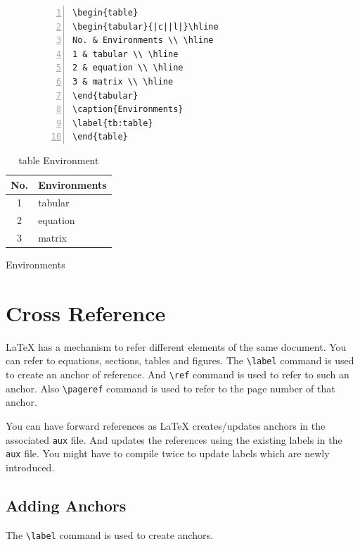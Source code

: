 \documentclass{article}
\theoremstyle{definition}
\theoremstyle{remark}
\begin{document}
\begin{table}[h]
\centering
\begin{subfigure}{0.45\textwidth}
\begin{Verbatim}[numbers = left]
\begin{table}
\begin{tabular}{|c||l|}\hline
No. & Environments \\ \hline
1 & tabular \\ \hline
2 & equation \\ \hline
3 & matrix \\ \hline
\end{tabular}
\caption{Environments}
\label{tb:table}
\end{table}
\end{Verbatim}
\end{subfigure}
\begin{minipage}{0.45\textwidth} 
\centering
\begin{tabular}{|c||l|} \hline
 No. & Environments \\ \hline
1 & tabular \\ \hline
2 & equation \\ \hline
3 & matrix \\ \hline
\end{tabular}
\caption{Environments}
\label{tb:table}
\end{minipage}
\caption{table Environment}
\label{tb:tableEnvironment}
\end{table}

\section{Cross Reference} \label{sec:reference}
	\LaTeX{} has a mechanism to refer different elements of the same document. You can refer to equations, sections, tables and figures. The \texttt{\textbackslash label} command is used to create an anchor of reference. And \texttt{\textbackslash ref} command is used to refer to such an anchor. Also \texttt{\textbackslash pageref} command is used to refer to the page number of that anchor.
	
	You can have forward references as \LaTeX{} creates/updates anchors in the associated \texttt{aux} file. And updates the references using the existing labels in the \texttt{aux} file. You might have to compile twice to update labels which are newly introduced.

\subsection{Adding Anchors}
	The \texttt{\textbackslash label} command is used to create anchors.
	
\end{document}
